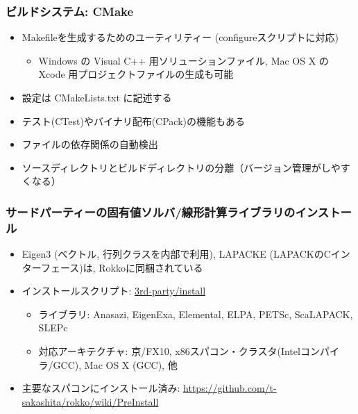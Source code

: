 \begin{frame}
  \frametitle{ビルドシステム: CMake}
  \begin{itemize}
    \setlength{\itemsep}{1em}
  \item Makefileを生成するためのユーティリティー (configureスクリプトに対応)
    \begin{itemize}
    \item Windows の Visual C++ 用ソリューションファイル, Mac OS X の Xcode 用プロジェクトファイルの生成も可能
    \end{itemize}
  \item 設定は CMakeLists.txt に記述する
  \item テスト(CTest)やバイナリ配布(CPack)の機能もある
  \item ファイルの依存関係の自動検出
  \item ソースディレクトリとビルドディレクトリの分離（バージョン管理がしやすくなる）
  \end{itemize}
\end{frame}

\begin{frame}
  \frametitle{サードパーティーの固有値ソルバ/線形計算ライブラリのインストール}
  \begin{itemize}
    \setlength{\itemsep}{1em}
  \item Eigen3 (ベクトル, 行列クラスを内部で利用), LAPACKE (LAPACKのCインターフェース)は, Rokkoに同梱されている
  \item インストールスクリプト: \href{https://github.com/t-sakashita/rokko/tree/master/3rd-party/install}{3rd-party/install}
    \begin{itemize}
      \item ライブラリ: Anasazi, EigenExa, Elemental, ELPA, PETSc, ScaLAPACK, SLEPc
      \item 対応アーキテクチャ: 京/FX10, x86スパコン・クラスタ(Intelコンパイラ/GCC), Mac OS X (GCC), 他
    \end{itemize}
  \item 主要なスパコンにインストール済み: \url{https://github.com/t-sakashita/rokko/wiki/PreInstall}
  \end{itemize}
\end{frame}

